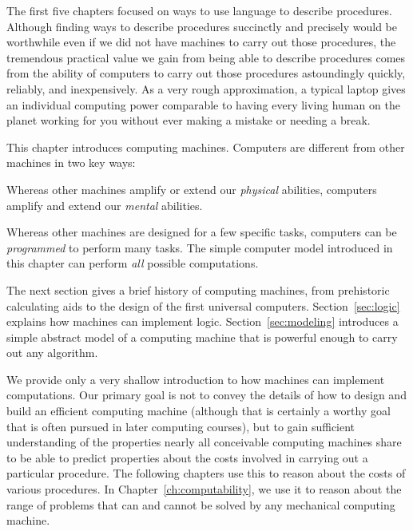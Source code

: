 \begin{schemeregion}


The first five chapters focused on ways to use language to describe procedures.  Although finding ways to describe procedures succinctly and precisely would be worthwhile even if we did not have machines to carry out those procedures, the tremendous practical value we gain from being able to describe procedures comes from the ability of computers to carry out those procedures astoundingly quickly, reliably, and inexpensively.  As a very rough approximation, a typical laptop gives an individual computing power comparable to having every living human on the planet working for you without ever making a mistake or needing a break.

This chapter introduces computing machines.  Computers are different from other machines in two key ways: 
\begin{enumtight}
\item Whereas other machines amplify or extend our \emph{physical} abilities, computers amplify and extend our \emph{mental} abilities.
\item Whereas other machines are designed for a few specific tasks, computers can be \emph{programmed} to perform many tasks.  The simple computer model introduced in this chapter can perform \emph{all} possible computations.
\end{enumtight}

The next section gives a brief history of computing machines, from prehistoric calculating aids to the design of the first universal computers.  Section~\ref{sec:logic} explains how machines can implement logic.  Section~\ref{sec:modeling} introduces a simple abstract model of a computing machine that is powerful enough to carry out any algorithm.

We provide only a very shallow introduction to how machines can implement computations.  Our primary goal is not to convey the details of how to design and build an efficient computing machine (although that is certainly a worthy goal that is often pursued in later computing courses), but to gain sufficient understanding of the properties nearly all conceivable computing machines share to be able to predict properties about the costs involved in carrying out a particular procedure.  The following chapters use this to reason about the costs of various procedures.  In Chapter~\ref{ch:computability}, we use it to reason about the range of problems that can and cannot be solved by any mechanical computing machine.


\end{schemeregion}
